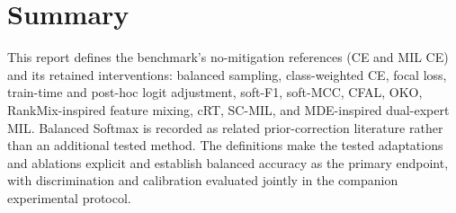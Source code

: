 \documentclass[11pt]{article}
\begin{document}
\section{Summary}
\label{sec:summary}
This report defines the benchmark's no-mitigation references (CE and MIL CE) and its retained interventions: balanced sampling, class-weighted CE, focal loss, train-time and post-hoc logit adjustment, soft-F1, soft-MCC, CFAL, OKO, RankMix-inspired feature mixing, cRT, SC-MIL, and MDE-inspired dual-expert MIL. Balanced Softmax is recorded as related prior-correction literature rather than an additional tested method. The definitions make the tested adaptations and ablations explicit and establish balanced accuracy as the primary endpoint, with discrimination and calibration evaluated jointly in the companion experimental protocol.

\clearpage


\end{document}
